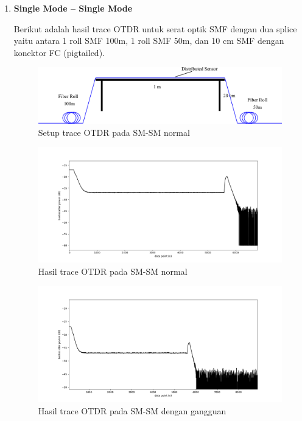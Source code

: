 \documentclass[12pt]{article}
\begin{document}
\begin{enumerate}
\newpage
		\item \textbf{Single Mode – Single Mode}
		
		Berikut adalah hasil trace OTDR untuk serat optik SMF dengan dua splice yaitu antara 1 roll SMF 100m, 1 roll SMF 50m, dan 10 cm SMF dengan konektor FC (pigtailed).
		
		\begin{figure}[!h]
			\centering
			\captionsetup{justification=centering}
			\includegraphics[width=\linewidth]{images/Bab_4/Bab_4_3b0}
			\caption[Trace SMF-SMF]{\small{Setup trace OTDR pada SM-SM normal}}
		\end{figure}
		
		\begin{figure}[!h]
			\centering
			\captionsetup{justification=centering}
			\includegraphics[width=\linewidth]{images/Bab_4/Bab_4_3b1}
			\caption[Trace SMF-SMF]{\small{Hasil trace OTDR pada SM-SM normal}}
		\end{figure}
		
		\begin{figure}[!h]
			\centering
			\captionsetup{justification=centering}
			\includegraphics[width=\linewidth]{images/Bab_4/Bab_4_3b2}
			\caption[Trace SMF-SMF]{\small{Hasil trace OTDR pada SM-SM dengan gangguan}}
		\end{figure}
		

\end{enumerate}
\end{document}
